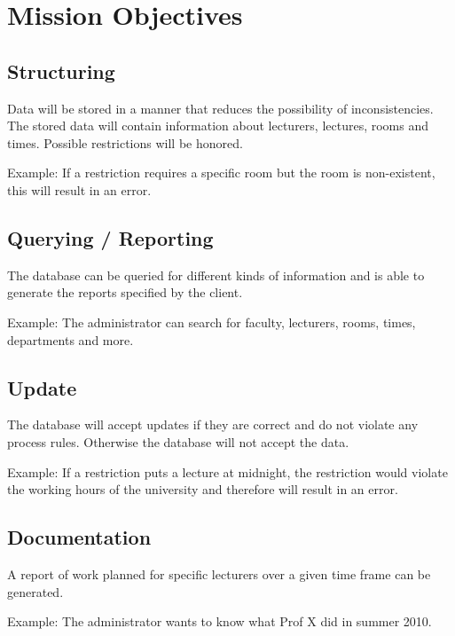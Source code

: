 \section{Mission Objectives}
\subsection{Structuring}
Data will be stored in a manner that reduces the possibility of inconsistencies. The stored data
will contain information about lecturers, lectures, rooms and times. Possible restrictions
will be honored.

Example: If a restriction requires a specific room but the room is non-existent, this
will result in an error.

\subsection{Querying / Reporting}
The database can be queried for different kinds of information and is able to generate the reports
specified by the client.

Example: The administrator can search for faculty, lecturers, rooms, times, departments and more.

\subsection{Update}
The database will accept updates if they are correct and do not violate any process rules. Otherwise the database
will not accept the data.

Example: If a restriction puts a lecture at midnight, the restriction would violate the working hours of the
university and therefore will result in an error.

\subsection{Documentation}
A report of work planned for specific lecturers over a given time frame can be generated.

Example: The administrator wants to know what Prof X did in summer 2010.
